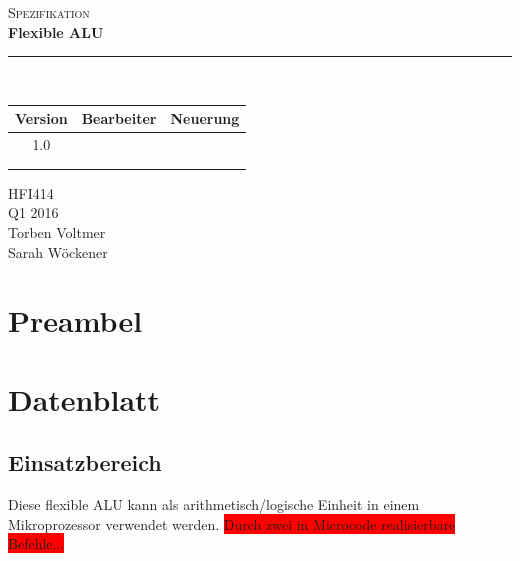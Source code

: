 \documentclass[11pt]{report}
\newcommand{\HRule}[1]{\rule{\linewidth}{#1}} 	%
\begin{document}
	\begin{titlepage}
		\begin{center}
			\textsc{\Large Spezifikation}\\
			
			{ \huge \bfseries Flexible ALU \\[0.4cm] }
			\HRule{0.5pt} \\[2.5cm]			
		\end{center}
		
		\begin{table}[h]
			\centering
			\begin{tabular}{l|l|l}
				\multicolumn{1}{c|}{\Large \textbf{  Version  }} & \multicolumn{1}{c|}{\Large \textbf{  Bearbeiter  }} & \multicolumn{1}{c}{\Large \textbf{  Neuerung  }} \\ \hline
				\multicolumn{1}{c|}{1.0}              & \multicolumn{1}{c|}{}                    & \multicolumn{1}{c}{}                  \\
				&                                          &                                       \\
				&                                          &                                      
			\end{tabular}
		\end{table}
		
		\vfill
		\begin{flushright}
			HFI414\\
			Q1 2016\\
			Torben Voltmer\\
			Sarah Wöckener\\
		\end{flushright}
	\end{titlepage}
	\tableofcontents
	
	\pagebreak
	
	\chapter{Preambel}
	
	\chapter{Datenblatt}
	
	\section{Einsatzbereich}
	Diese flexible ALU kann als arithmetisch/logische Einheit in einem Mikroprozessor verwendet werden.
	\colorbox{red}{Durch zwei in Microcode realisierbare Befehle...}
	
\end{document}
